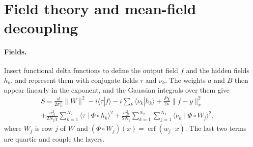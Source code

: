 \documentclass[11pt,a4paper]{article}
\newcommand{\erf}{\operatorname{erf}}
\begin{document}
\section{Field theory and mean-field decoupling}
\paragraph{Fields.}
Insert functional delta functions to define the output field $f$ and the hidden fields $h_k$, and represent them with conjugate fields
$\tau$ and $\nu_k$.
The weights $a$ and $B$ then appear linearly in the exponent, and the Gaussian integrals over them give
\begin{multline}
  S=\frac{d}{2\sigma_w^2}\|W\|^2-i\langle\tau|f\rangle-i\sum_{k}\langle\nu_k|h_k\rangle+\frac{P\chi}{2\kappa}\|f-y\|_x^2\\
  +\frac{\sigma_A^2}{2N_2\chi}\sum_{k=1}^{N_2}\langle\tau\mid\Phi\circ h_k\rangle^2
  +\frac{\sigma_B^2}{2N_1}\sum_{k=1}^{N_2}\sum_{j=1}^{N_1}\langle\nu_k\mid\Phi\circ W_j\rangle^2 ,
  \label{eq:S}
\end{multline}
where $W_j$ is row $j$ of $W$ and $(\Phi\circ W_j)(x)=\erf(w_j\cdot x)$.
The last two terms are quartic and couple the layers.
\end{document}
